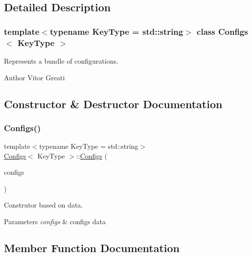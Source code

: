 \subsection{Detailed Description}
\subsubsection*{template$<$typename Key\+Type = std\+::string$>$\newline
class Configs$<$ Key\+Type $>$}

Represents a bundle of configurations. 

\begin{DoxyAuthor}{Author}
Vitor Greati 
\end{DoxyAuthor}


\subsection{Constructor \& Destructor Documentation}
\mbox{\label{class_configs_aec48de783d43244d4ecf7c6cd30120c6}} 
\subsubsection{\texorpdfstring{Configs()}{Configs()}}
{\footnotesize\ttfamily template$<$typename Key\+Type = std\+::string$>$ \\
\mbox{\hyperlink{class_configs}{Configs}}$<$ Key\+Type $>$\+::\mbox{\hyperlink{class_configs}{Configs}} (\begin{DoxyParamCaption}\item[{Configs\+Data}]{configs }\end{DoxyParamCaption})\hspace{0.3cm}{\ttfamily [inline]}}



Construtor based on data. 


\begin{DoxyParams}{Parameters}
{\em configs} & configs data \\
\hline
\end{DoxyParams}


\subsection{Member Function Documentation}
\mbox{\label{class_configs_a6e7f850ce09a2298daf3634bfc0aba35}} 
